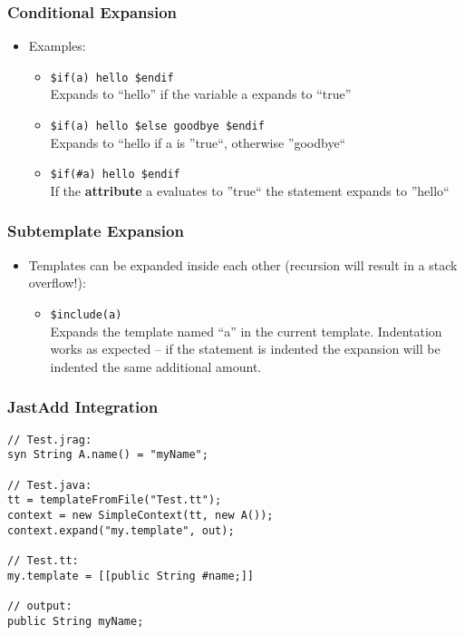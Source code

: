 \documentclass[a4paper,12pt,presentation]{beamer}
\begin{document}
\begin{frame}[fragile]
    \frametitle{Conditional Expansion}
    \begin{itemize}
        \item Examples:
            \begin{itemize}
                \item \verb'$if(a) hello $endif' \\
                    Expands to ``hello'' if
                    the variable a expands to ``true''
                \item \verb'$if(a) hello $else goodbye $endif' \\
                    Expands to
                    ``hello if a is ''true``, otherwise ''goodbye``
                \item \verb'$if(#a) hello $endif' \\
                    If the {\bf attribute} a
                    evaluates to ''true`` the statement expands to ''hello``
            \end{itemize}
    \end{itemize}
\end{frame}

\begin{frame}[fragile]
    \frametitle{Subtemplate Expansion}
    \begin{itemize}
        \item Templates can be expanded inside each other (recursion will
            result in a stack overflow!):
            \begin{itemize}
                \item \verb'$include(a)' \\
                    Expands the template named ``a'' in the current template.
                    Indentation works as expected -- if the statement is
                    indented the expansion will be indented the same additional
                    amount.
            \end{itemize}
    \end{itemize}
\end{frame}

\begin{frame}[fragile]
    \frametitle{JastAdd Integration}

    \begin{verbatim}
// Test.jrag:
syn String A.name() = "myName";

// Test.java:
tt = templateFromFile("Test.tt");
context = new SimpleContext(tt, new A());
context.expand("my.template", out);

// Test.tt:
my.template = [[public String #name;]]

// output:
public String myName;
    \end{verbatim}
\end{frame}
\end{document}
